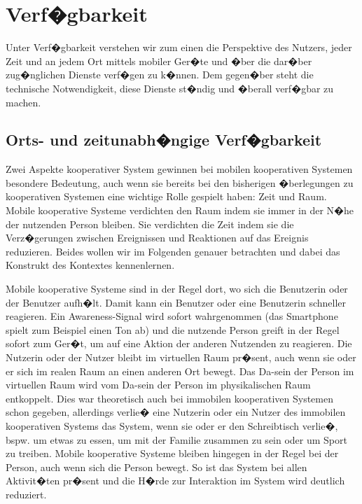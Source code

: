  






\section{Verf�gbarkeit}
Unter Verf�gbarkeit verstehen wir zum einen die Perspektive des Nutzers, jeder Zeit und an jedem Ort mittels mobiler Ger�te und �ber die dar�ber zug�nglichen Dienste verf�gen zu k�nnen. Dem gegen�ber steht die technische Notwendigkeit, diese Dienste st�ndig und �berall verf�gbar zu machen. 

\subsection{Orts- und zeitunabh�ngige Verf�gbarkeit}
Zwei Aspekte kooperativer System gewinnen bei mobilen kooperativen Systemen besondere Bedeutung, auch wenn sie bereits bei den bisherigen �berlegungen zu kooperativen Systemen eine wichtige Rolle gespielt haben: Zeit und Raum. Mobile kooperative Systeme verdichten den Raum indem sie immer in der N�he der nutzenden Person bleiben. Sie verdichten die Zeit indem sie die Verz�gerungen zwischen Ereignissen und Reaktionen auf das Ereignis reduzieren. Beides wollen wir im Folgenden genauer betrachten und dabei das Konstrukt des Kontextes kennenlernen.

Mobile kooperative Systeme sind in der Regel dort, wo sich die Benutzerin oder der Benutzer aufh�lt. Damit kann ein Benutzer oder eine Benutzerin schneller reagieren. Ein Awareness-Signal wird sofort wahrgenommen (das Smartphone spielt zum Beispiel einen Ton ab) und die nutzende Person greift in der Regel sofort zum Ger�t, um auf eine Aktion der anderen Nutzenden zu reagieren. Die Nutzerin oder der Nutzer bleibt im virtuellen Raum pr�sent, auch wenn sie oder er sich im realen Raum an einen anderen Ort bewegt. Das Da-sein der Person im virtuellen Raum wird vom Da-sein der Person im physikalischen Raum entkoppelt. Dies war theoretisch auch bei immobilen kooperativen Systemen schon gegeben, allerdings verlie� eine Nutzerin oder ein Nutzer des immobilen kooperativen Systems das System, wenn sie oder er den Schreibtisch verlie�, bspw. um etwas zu essen, um mit der Familie zusammen zu sein oder um Sport zu treiben. Mobile kooperative Systeme bleiben hingegen in der Regel bei der Person, auch wenn  sich die Person bewegt. So ist das System bei allen Aktivit�ten pr�sent und die H�rde zur Interaktion im System wird deutlich reduziert. 

